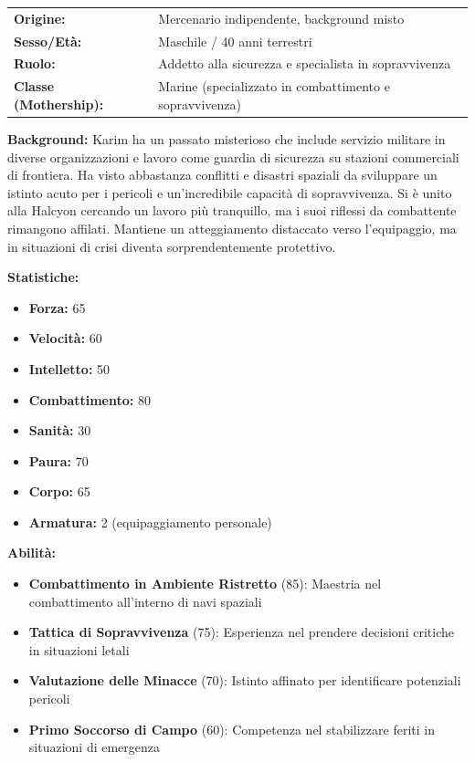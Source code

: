 \documentclass[11pt,a4paper]{article}
\begin{document}
\begin{tcolorbox}[colback=mininglightorange!20, colframe=miningorange]
\begin{tabularx}{\textwidth}{lX}
\textbf{Origine:} & Mercenario indipendente, background misto \\
\textbf{Sesso/Età:} & Maschile / 40 anni terrestri \\
\textbf{Ruolo:} & Addetto alla sicurezza e specialista in sopravvivenza \\
\textbf{Classe (Mothership):} & Marine (specializzato in combattimento e sopravvivenza) \\
\end{tabularx}

\textbf{Background:} Karim ha un passato misterioso che include servizio militare in diverse organizzazioni e lavoro come guardia di sicurezza su stazioni commerciali di frontiera. Ha visto abbastanza conflitti e disastri spaziali da sviluppare un istinto acuto per i pericoli e un'incredibile capacità di sopravvivenza. Si è unito alla Halcyon cercando un lavoro più tranquillo, ma i suoi riflessi da combattente rimangono affilati. Mantiene un atteggiamento distaccato verso l'equipaggio, ma in situazioni di crisi diventa sorprendentemente protettivo.

\textbf{Statistiche:}
\begin{itemize}[leftmargin=*]
\item \textbf{Forza:} 65
\item \textbf{Velocità:} 60
\item \textbf{Intelletto:} 50
\item \textbf{Combattimento:} 80
\item \textbf{Sanità:} 30
\item \textbf{Paura:} 70
\item \textbf{Corpo:} 65
\item \textbf{Armatura:} 2 (equipaggiamento personale)
\end{itemize}

\textbf{Abilità:}
\begin{itemize}[leftmargin=*]
\item \textbf{Combattimento in Ambiente Ristretto} (85): Maestria nel combattimento all'interno di navi spaziali
\item \textbf{Tattica di Sopravvivenza} (75): Esperienza nel prendere decisioni critiche in situazioni letali
\item \textbf{Valutazione delle Minacce} (70): Istinto affinato per identificare potenziali pericoli
\item \textbf{Primo Soccorso di Campo} (60): Competenza nel stabilizzare feriti in situazioni di emergenza
\end{itemize}


\end{tcolorbox}
\end{document}
